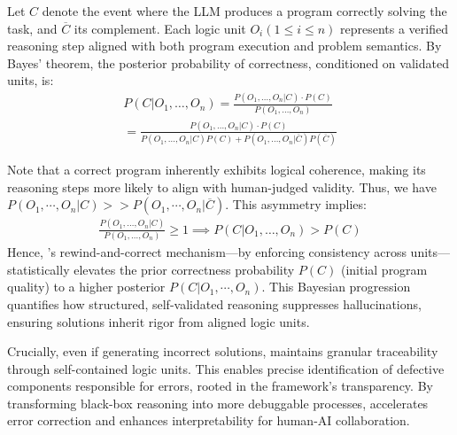 Let $C$ denote the event where the LLM produces a program correctly solving the task, and $\overline{C}$ its complement. Each logic unit $O_i (1 \leq i \leq n)$ represents a verified reasoning step aligned with both program execution and problem semantics.
By Bayes’ theorem, the posterior probability of correctness, conditioned on validated units, is:
\begin{align}
P(C|O_1, \ldots, O_n) = \frac{P(O_1, \ldots, O_n | C) \cdot P(C)}{P(O_1, \ldots, O_n)} \\
= \frac{P(O_1, \ldots, O_n | C)\cdot P(C)}{P(O_1, \ldots, O_n | C)P(C) + P(O_1, \ldots, O_n | \overline{C})P(\overline{C})}
\end{align}

Note that a correct program inherently exhibits logical coherence, making its reasoning steps more likely to align with human-judged validity. Thus, we have $P(O_1,\cdots, O_n|C) >> P(O_1,\cdots, O_n|\overline{C})$. This asymmetry implies:
\begin{align}
\frac{P(O_1, \ldots, O_n | C)}{P(O_1, \ldots, O_n)} \geq 1 \implies P(C|O_1, \ldots, O_n) > P(C)
\end{align}
Hence, \tool’s rewind-and-correct mechanism—by enforcing consistency across units—statistically elevates the prior correctness probability $P(C)$ (initial program quality) to a higher posterior $P(C|O_1, \cdots, O_n)$. This Bayesian progression quantifies how structured, self-validated reasoning suppresses hallucinations, ensuring solutions inherit rigor from aligned logic units.

Crucially, even if generating incorrect solutions, \tool maintains granular traceability through self-contained logic units. This enables precise identification of defective components responsible for errors, rooted in the framework's transparency. By transforming black-box reasoning into more debuggable processes, \tool accelerates error correction and enhances interpretability for human-AI collaboration.